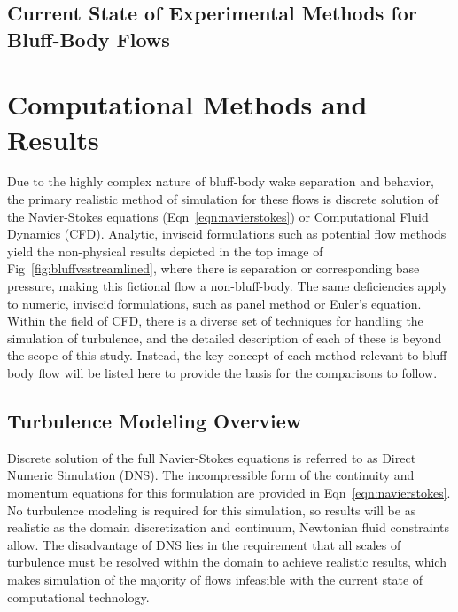 \documentclass[journal]{new-aiaa}
\begin{document}
\subsection{Current State of Experimental Methods for Bluff-Body Flows} \label{subsec:currentstateexperimental}













\section{Computational Methods and Results} \label{sec:computationalmethods}

Due to the highly complex nature of bluff-body wake separation and behavior, the primary realistic method of simulation for these flows is discrete solution of the Navier-Stokes equations (Eqn~\ref{eqn:navierstokes}) or Computational Fluid Dynamics (CFD). Analytic, inviscid formulations such as potential flow methods yield the non-physical results depicted in the top image of Fig~\ref{fig:bluffvsstreamlined}, where there is separation or corresponding base pressure, making this fictional flow a non-bluff-body. The same deficiencies apply to numeric, inviscid formulations, such as panel method or Euler's equation. Within the field of CFD, there is a diverse set of techniques for handling the simulation of turbulence, and the detailed description of each of these is beyond the scope of this study. Instead, the key concept of each method relevant to bluff-body flow will be listed here to provide the basis for the comparisons to follow.


\subsection{Turbulence Modeling Overview} \label{subsec:turbulencemodeling}

 Discrete solution of the full Navier-Stokes equations is referred to as Direct Numeric Simulation (DNS). The incompressible form of the continuity and momentum equations for this formulation are provided in Eqn~\ref{eqn:navierstokes}. No turbulence modeling is required for this simulation, so results will be as realistic as the domain discretization and continuum, Newtonian fluid constraints allow. The disadvantage of DNS lies in the requirement that all scales of turbulence must be resolved within the domain to achieve realistic results, which makes simulation of the majority of flows infeasible with the current state of computational technology.
\end{document}
